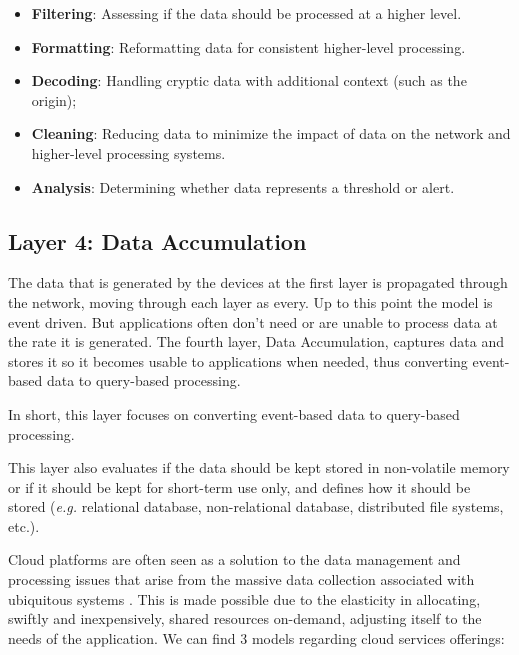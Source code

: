 \begin{itemize}
    \item \textbf{Filtering}: Assessing if the data should be processed at a higher level. 
    \item \textbf{Formatting}: Reformatting data for consistent higher-level processing.
    \item \textbf{Decoding}: Handling cryptic data with additional context (such as the origin);
    \item \textbf{Cleaning}: Reducing data to minimize the impact of data on the network and higher-level processing systems.
    \item \textbf{Analysis}: Determining whether data represents a threshold or alert.
\end{itemize}

\subsection{Layer 4: Data Accumulation}
\label{sec:iot-model-layer4}


The data that is generated by the devices at the first layer is propagated through the network, moving through each layer as every. Up to this point the model is event driven. But applications often don't need or are unable to process data at the rate it is generated. The fourth layer, Data Accumulation, captures data and stores it so it becomes usable to applications when needed, thus converting event-based data to query-based processing. 

In short, this layer focuses on converting event-based data to query-based processing. 

This layer also evaluates if the data should be kept stored in non-volatile memory or if it should be kept for short-term use only, and defines how it should be stored (\textit{e.g.} relational database, non-relational database, distributed file systems, etc.).

Cloud platforms are often seen as a solution to the data management and processing issues that arise from the massive data collection associated with ubiquitous systems \cite{Baker2017}. This is made possible due to the elasticity in allocating, swiftly and inexpensively, shared resources on-demand, adjusting itself to the needs of the application. We can find 3 models regarding cloud services offerings:

